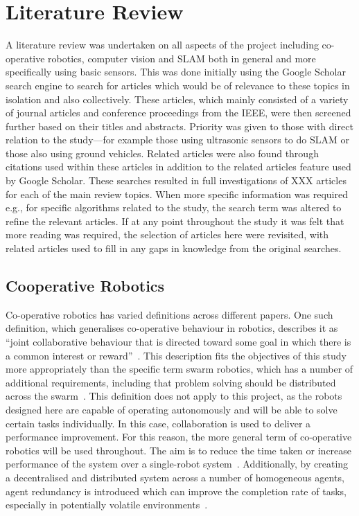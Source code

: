 
\chapter{Literature Review}\label{litreview}
A literature review was undertaken on all aspects of the project including
co-operative robotics, computer vision and SLAM both in general and more
specifically using basic sensors. This was done initially using the Google
Scholar search engine to search for articles which would be of relevance to
these topics in isolation and also collectively. These articles, which mainly
consisted of a variety of journal articles and conference proceedings from
the IEEE, were then screened further based on their titles and abstracts.
Priority was given to those with direct relation to the study---for example
those using ultrasonic sensors to do SLAM or those also using ground vehicles.
Related articles were also found through citations used within these articles
in addition to the related articles feature used by Google Scholar. These
searches resulted in full investigations of XXX articles for each of the main
review topics. When more specific information was required e.g., for specific
algorithms related to the study, the search term was altered to refine the
relevant articles. If at any point throughout the study it was felt that more
reading was required, the selection of articles here were revisited, with
related articles used to fill in any gaps in knowledge from the original
searches. 

\section{Cooperative Robotics}\label{litreview/coop}
Co-operative robotics has varied definitions across different papers. One such
definition, which generalises co-operative behaviour in robotics, describes it as ``joint
collaborative behaviour that is directed toward some goal in which there is a
common interest or reward''~\cite{barnes1991behaviour}. This description fits the
objectives of this study more appropriately than the specific term swarm robotics, which
has a number of additional requirements, including
that problem solving should be distributed across the swarm~\cite{sahin04}.
This definition does not apply to this project, as the robots designed
here are capable of operating autonomously and will be able to solve certain tasks
individually. In this case, collaboration is used to deliver a performance improvement.
For this reason, the more general term of co-operative robotics will
be used throughout. The aim is to reduce the time taken or increase performance of the system over
a single-robot system~\cite{premvuti1990consideration}. Additionally, by creating a decentralised
and distributed system across a number of homogeneous agents, agent redundancy is introduced which
can improve the completion rate of tasks, especially in potentially volatile
environments~\cite{beckers1994local, parker95}.

